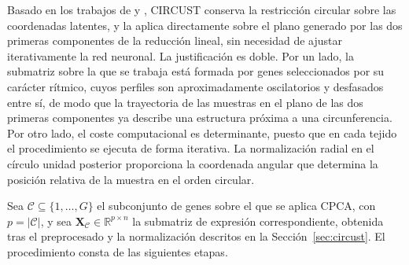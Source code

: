 \documentclass[12pt, a4paper]{report}
\begin{document}
Basado en los trabajos de \citet{CPCAKirby} y \citet{scholz2007}, CIRCUST conserva la restricción circular sobre las coordenadas latentes, y la aplica directamente sobre el plano generado por las dos primeras componentes de la reducción lineal, sin necesidad de ajustar iterativamente la red neuronal. La justificación es doble. Por un lado, la submatriz sobre la que se trabaja está formada por genes seleccionados por su carácter rítmico, cuyos perfiles son aproximadamente oscilatorios y desfasados entre sí, de modo que la trayectoria de las muestras en el plano de las dos primeras componentes ya describe una estructura próxima a una circunferencia. Por otro lado, el coste computacional es determinante, puesto que en cada tejido el procedimiento se ejecuta de forma iterativa. La normalización radial en el círculo unidad posterior proporciona la coordenada angular que determina la posición relativa de la muestra en el orden circular.

Sea \(\mathcal{C}\subseteq\{1,\ldots,G\}\) el subconjunto de genes sobre el que se aplica CPCA, con \(p=|\mathcal{C}|\), y sea \(\mathbf{X}_{\mathcal{C}}\in\mathbb{R}^{p\times n}\) la submatriz de expresión correspondiente, obtenida tras el preprocesado y la normalización descritos en la Sección~\ref{sec:circust}. El procedimiento consta de las siguientes etapas.
\end{document}
